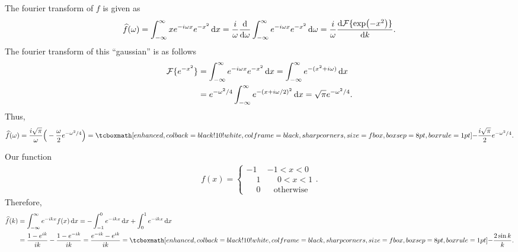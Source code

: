 
The fourier transform of $f$ is given as
\begin{eqnarray}
    \label{eq:fourier-trans-f}
    \widehat{f}(\omega) = \int_{-\infty}^{\infty} xe^{-i\omega x} e^{-x^2} \dd{x} = \frac{i}{\omega} \dv{\omega} \int_{-\infty}^{\infty} e^{-i\omega x} e^{-x^2} \dd{\omega} = \frac{i}{\omega}\dv{\mathcal{F}\{\exp(-x^2)\}}{k}
.\end{eqnarray}
The fourier transform of this ``gaussian'' is as follows
\begin{align}
    \label{eq:fourier-trans-gauss}
    \mathcal{F}\{ e^{-x^2} \} &= \int_{-\infty}^{\infty} e^{-i\omega x} e^{-x^2} \dd{x} = \int_{-\infty}^{\infty} e^{-(x^2 + i\omega)} \dd{x} \notag \\
                              &= e^{-\omega^2/4} \int_{-\infty}^{\infty} e^{-(x + i\omega/2)^2} \dd{x} = \sqrt{\pi} e^{-\omega^2/4}
.\end{align}
Thus,
\begin{eqnarray}
    \label{eq:fourier-deriv}
\widehat{f}(\omega) = \frac{i\sqrt{\pi}}{\omega} \Big( -\frac{\omega}{2} e^{-\omega^2/4} \Big) = \eqbox{ -\frac{i\sqrt{\pi}}{2} e^{-\omega^2/4} }
.\end{eqnarray}



Our function
\begin{eqnarray}
    \label{eq:f-piecewise}
    f(x) = 
    \begin{cases}
        -1 & -1 < x < 0 \\
        \phantom{-}1 &  \phantom{-}0 < x < 1 \\
        \phantom{-}0 &  \phantom{-}\mbox{otherwise}
    \end{cases}
.\end{eqnarray}
Therefore,
\begin{align}
    \label{eq:fourier-f}
    \widehat{f}(k) &= \int_{-\infty}^{\infty} e^{-ikx} f(x) \dd{x} = -\int_{-1}^{0} e^{-ikx} \dd{x} + \int_{0}^{1} e^{-ikx} \dd{x} \notag \\
                   &= \frac{1 - e^{ik}}{ik} - \frac{1 - e^{-ik}}{ik} = \frac{e^{-ik} - e^{ik}}{ik} = \eqbox{-\frac{2\sin{k}}{k}}
.\end{align}

